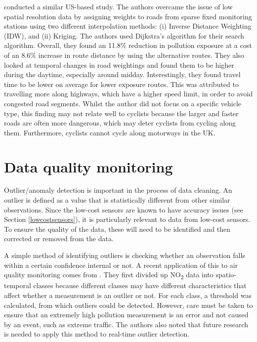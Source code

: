 \documentclass[11pt]{report}
\begin{document}
\cite{sharker2014exposureroutes} conducted a similar US-based study. The authors overcame the issue of low spatial resolution data by assigning weights to roads from sparse fixed monitoring stations using two different interpolation methods: (i) Inverse Distance Weighting (IDW), and (ii) Kriging. The authors used Dijkstra's algorithm for their search algorithm. Overall, they found an 11.8\% reduction in pollution exposure at a cost of an 8.6\% increase in route distance by using the alternative routes. They also looked at temporal changes in road weightings and found them to be higher during the daytime, especially around midday. Interestingly, they found travel time to be lower on average for lower exposure routes. This was attributed to travelling more along highways, which have a higher speed limit, in order to avoid congested road segments. Whilst the author did not focus on a specific vehicle type, this finding may not relate well to cyclists because the larger and faster roads are often more dangerous, which may deter cyclists from cycling along them. Furthermore, cyclists cannot cycle along motorways in the UK. 

\section{Data quality monitoring}

Outlier/anomaly detection is important in the process of data cleaning. An outlier is defined as a value that is statistically different from other similar observations. Since the low-cost sensors are known to have accuracy issues (see Section \ref{lowcostsensors}), it is particularly relevant to data from low-cost sensors. To ensure the quality of the data, these will need to be identified and then corrected or removed from the data.

A simple method of identifying outliers is checking whether an observation falls within a certain confidence internal or not. A recent application of this to air quality monitoring comes from \cite{vanZoest2018outlierdetection}. They first divided up NO\textsubscript{2} data into spatio-temporal classes because different classes may have different characteristics that affect whether a measurement is an outlier or not. For each class, a threshold was calculated, from which outliers could be detected.  However, care must be taken to ensure that an extremely high pollution measurement is an error and not caused by an event, such as extreme traffic. The authors also noted that future research is needed to apply this method to real-time outlier detection.
\end{document}
